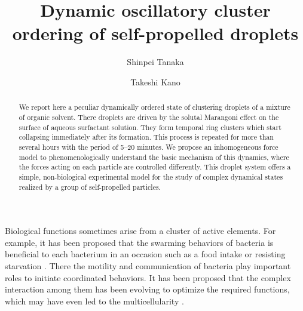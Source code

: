 \documentclass[showpacs]{revtex4-1}
\begin{document}
\title{Dynamic oscillatory cluster ordering of self-propelled droplets}

\author{Shinpei Tanaka}


\author{Takeshi Kano}


\begin{abstract}
 We report here a peculiar dynamically ordered state of clustering
 droplets of a mixture of organic solvent. There droplets are driven by
 the solutal Marangoni effect on the surface of aqueous surfactant
 solution. They form temporal ring clusters which start collapsing
 immediately after its formation. This process is repeated for more than
 several hours with the period of 5--20 minutes. We propose an
 inhomogeneous force model to phenomenologically understand the basic
 mechanism of this dynamics, where the forces acting on each particle
 are controlled differently. This droplet system offers a simple,
 non-biological experimental model for the study of complex dynamical
 states realized by a group of self-propelled particles.
\end{abstract}
\maketitle

%

Biological functions sometimes arise from a cluster of
active elements. For example, it has been proposed that the swarming
behaviors of bacteria is beneficial to each bacterium in an occasion
such as a food intake or resisting starvation \cite{Kaiser2003}. There
the motility and communication of bacteria play important roles to
initiate coordinated behaviors. It has been proposed that the complex
interaction among them has been evolving to optimize the required
functions, which may have even led to the multicellularity
\cite{Shapiro1998}.
\end{document}
